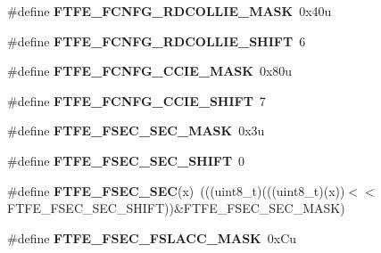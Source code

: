 \begin{DoxyCompactItemize}
\item 
\#define {\bfseries F\+T\+F\+E\+\_\+\+F\+C\+N\+F\+G\+\_\+\+R\+D\+C\+O\+L\+L\+I\+E\+\_\+\+M\+A\+SK}~0x40u\hypertarget{group__FTFE__Register__Masks_gad401ef9e82184d706725e195999b1b6d}{}\label{group__FTFE__Register__Masks_gad401ef9e82184d706725e195999b1b6d}

\item 
\#define {\bfseries F\+T\+F\+E\+\_\+\+F\+C\+N\+F\+G\+\_\+\+R\+D\+C\+O\+L\+L\+I\+E\+\_\+\+S\+H\+I\+FT}~6\hypertarget{group__FTFE__Register__Masks_gad7f01bb5b4a2822faeec68491b844993}{}\label{group__FTFE__Register__Masks_gad7f01bb5b4a2822faeec68491b844993}

\item 
\#define {\bfseries F\+T\+F\+E\+\_\+\+F\+C\+N\+F\+G\+\_\+\+C\+C\+I\+E\+\_\+\+M\+A\+SK}~0x80u\hypertarget{group__FTFE__Register__Masks_gaff1694ff98f006483492c0e8748caf61}{}\label{group__FTFE__Register__Masks_gaff1694ff98f006483492c0e8748caf61}

\item 
\#define {\bfseries F\+T\+F\+E\+\_\+\+F\+C\+N\+F\+G\+\_\+\+C\+C\+I\+E\+\_\+\+S\+H\+I\+FT}~7\hypertarget{group__FTFE__Register__Masks_gac794dc0a13a52c3702e799d92141f7f5}{}\label{group__FTFE__Register__Masks_gac794dc0a13a52c3702e799d92141f7f5}

\item 
\#define {\bfseries F\+T\+F\+E\+\_\+\+F\+S\+E\+C\+\_\+\+S\+E\+C\+\_\+\+M\+A\+SK}~0x3u\hypertarget{group__FTFE__Register__Masks_gad3ce37250b2d1b59816d2771ef828f7d}{}\label{group__FTFE__Register__Masks_gad3ce37250b2d1b59816d2771ef828f7d}

\item 
\#define {\bfseries F\+T\+F\+E\+\_\+\+F\+S\+E\+C\+\_\+\+S\+E\+C\+\_\+\+S\+H\+I\+FT}~0\hypertarget{group__FTFE__Register__Masks_gabb0120ba7f17b8ba8a56d75322e90596}{}\label{group__FTFE__Register__Masks_gabb0120ba7f17b8ba8a56d75322e90596}

\item 
\#define {\bfseries F\+T\+F\+E\+\_\+\+F\+S\+E\+C\+\_\+\+S\+EC}(x)~(((uint8\+\_\+t)(((uint8\+\_\+t)(x))$<$$<$F\+T\+F\+E\+\_\+\+F\+S\+E\+C\+\_\+\+S\+E\+C\+\_\+\+S\+H\+I\+FT))\&F\+T\+F\+E\+\_\+\+F\+S\+E\+C\+\_\+\+S\+E\+C\+\_\+\+M\+A\+SK)\hypertarget{group__FTFE__Register__Masks_ga40a3d5d921123a3ac7ea4c5a081e5a5e}{}\label{group__FTFE__Register__Masks_ga40a3d5d921123a3ac7ea4c5a081e5a5e}

\item 
\#define {\bfseries F\+T\+F\+E\+\_\+\+F\+S\+E\+C\+\_\+\+F\+S\+L\+A\+C\+C\+\_\+\+M\+A\+SK}~0x\+Cu\hypertarget{group__FTFE__Register__Masks_gabb6e4b7f5515626f6e19931ee6812e84}{}\label{group__FTFE__Register__Masks_gabb6e4b7f5515626f6e19931ee6812e84}


\end{DoxyCompactItemize}
